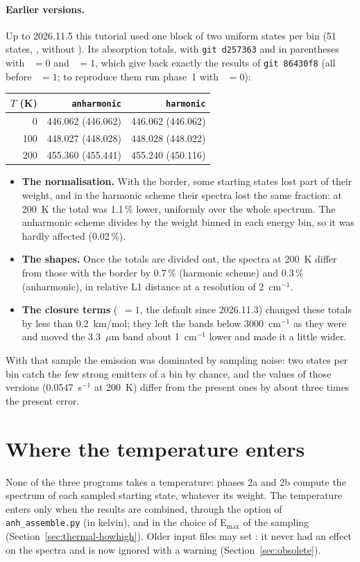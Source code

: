 \paragraph{Earlier versions.} Up to 2026.11.5 this tutorial used one
block of two uniform states per bin (51 states, , without ). Its
absorption totals, with \texttt{git d257363} and in parentheses with
~$=0$ and ~$=1$, which give back
exactly the results of \texttt{git 86430f8} (all before
~$=1$; to reproduce them run phase~1 with
~$=0$):
\begin{center}
\begin{tabular}{rrr}
\toprule
$T$ (K) & \texttt{anharmonic} & \texttt{harmonic} \\
\midrule
0 & 446.062 (446.062) & 446.062 (446.062) \\
100 & 448.027 (448.028) & 448.028 (448.022) \\
200 & 455.360 (455.441) & 455.240 (450.116) \\
\bottomrule
\end{tabular}
\end{center}
\begin{itemize}
\item \textbf{The normalisation.} With the border, some starting states
lost part of their weight, and in the harmonic scheme their spectra
lost the same fraction: at 200~K the total was 1.1\,\% lower, uniformly
over the whole spectrum. The anharmonic scheme divides by the weight
binned in each energy bin, so it was hardly affected (0.02\,\%).
\item \textbf{The shapes.} Once the totals are divided out, the spectra at
200~K differ from those with the border by 0.7\,\% (harmonic scheme)
and 0.3\,\% (anharmonic), in relative L1 distance at a resolution of
2~cm$^{-1}$.
\item \textbf{The closure terms} (~$=1$, the default
since 2026.11.3) changed these totals by less than 0.2~km/mol; they left
the bands below 3000~cm$^{-1}$ as they were and moved the 3.3~$\mu$m band
about 1~cm$^{-1}$ lower and made it a little wider.
\end{itemize}
With that sample the emission was dominated by sampling noise: two
states per bin catch the few strong emitters of a bin by chance, and the
values of those versions (0.0547~s$^{-1}$ at 200~K) differ from the
present ones by about three times the present error.

\section{Where the temperature enters}

None of the three programs takes a temperature: phases 2a and 2b compute
the spectrum of each sampled starting state, whatever its weight. The
temperature enters only when the results are combined, through the
 option of \texttt{anh\_assemble.py} (in kelvin), and in the
choice of E$_\mathrm{max}$ of the sampling
(Section~\ref{sec:thermal-howhigh}). Older input files may set
: it never had an effect on the spectra and is now ignored with a
warning (Section~\ref{sec:obsolete}).
